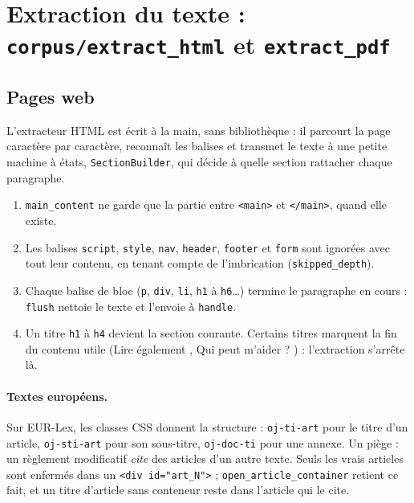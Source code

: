 \documentclass[11pt,a4paper]{article}
\begin{document}

\section{Extraction du texte : \texttt{corpus/extract\_html} et \texttt{extract\_pdf}}

\subsection{Pages web}

L'extracteur HTML est écrit à la main, sans bibliothèque : il parcourt la page caractère par caractère, reconnaît les balises et transmet le texte à une petite machine à états, \texttt{SectionBuilder}, qui décide à quelle section rattacher chaque paragraphe.

\begin{enumerate}
  \item \texttt{main\_content} ne garde que la partie entre \texttt{<main>} et \texttt{</main>}, quand elle existe.
  \item Les balises \texttt{script}, \texttt{style}, \texttt{nav}, \texttt{header}, \texttt{footer} et \texttt{form} sont ignorées avec tout leur contenu, en tenant compte de l'imbrication (\texttt{skipped\_depth}).
  \item Chaque balise de bloc (\texttt{p}, \texttt{div}, \texttt{li}, \texttt{h1} à \texttt{h6}\dots) termine le paragraphe en cours : \texttt{flush} nettoie le texte et l'envoie à \texttt{handle}.
  \item Un titre \texttt{h1} à \texttt{h4} devient la section courante. Certains titres marquent la fin du contenu utile (\og Lire également \fg, \og Qui peut m'aider ? \fg) : l'extraction s'arrête là.
\end{enumerate}


\paragraph{Textes européens.} Sur EUR-Lex, les classes CSS donnent la structure : \texttt{oj-ti-art} pour le titre d'un article, \texttt{oj-sti-art} pour son sous-titre, \texttt{oj-doc-ti} pour une annexe. Un piège : un règlement modificatif \emph{cite} des articles d'un autre texte. Seuls les vrais articles sont enfermés dans un \texttt{<div id="art\_N">} ; \texttt{open\_article\_container} retient ce fait, et un titre d'article sans conteneur reste dans l'article qui le cite.
\end{document}
